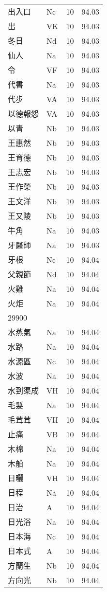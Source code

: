 \documentclass[twocolumn]{book}
\begin{document}
\begin{supertabular}{llrr}
出入口 & Nc & 10 &  94.03\\
出 & VK & 10 &  94.03\\
冬日 & Nd & 10 &  94.03\\
仙人 & Na & 10 &  94.03\\
令 & VF & 10 &  94.03\\
代書 & Na & 10 &  94.03\\
代步 & VA & 10 &  94.03\\
以德報怨 & VA & 10 &  94.03\\
以青 & Nb & 10 &  94.03\\
王惠然 & Nb & 10 &  94.03\\
王育德 & Nb & 10 &  94.03\\
王志宏 & Nb & 10 &  94.03\\
王作榮 & Nb & 10 &  94.03\\
王文洋 & Nb & 10 &  94.03\\
王又陵 & Nb & 10 &  94.03\\
牛角 & Na & 10 &  94.03\\
牙醫師 & Na & 10 &  94.03\\
牙根 & Nc & 10 &  94.04\\
父親節 & Nd & 10 &  94.04\\
火雞 & Na & 10 &  94.04\\
火炬 & Na & 10 &  94.04\\
29900\\
水蒸氣 & Na & 10 &  94.04\\
水路 & Na & 10 &  94.04\\
水源區 & Nc & 10 &  94.04\\
水波 & Na & 10 &  94.04\\
水到渠成 & VH & 10 &  94.04\\
毛髮 & Na & 10 &  94.04\\
毛茸茸 & VH & 10 &  94.04\\
止痛 & VB & 10 &  94.04\\
木棉 & Na & 10 &  94.04\\
木船 & Na & 10 &  94.04\\
日曬 & VH & 10 &  94.04\\
日程 & Na & 10 &  94.04\\
日治 & A & 10 &  94.04\\
日光浴 & Na & 10 &  94.04\\
日本海 & Nc & 10 &  94.04\\
日本式 & A & 10 &  94.04\\
方蘭生 & Nb & 10 &  94.04\\
方向光 & Nb & 10 &  94.04\\

\end{supertabular}
\end{document}
